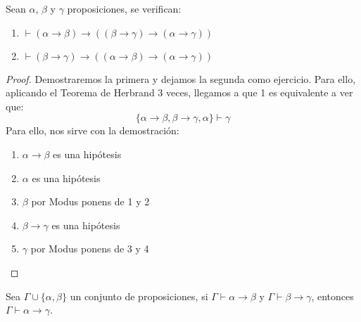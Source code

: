 \begin{prop}
    Sean $\alpha$, $\beta$ y $\gamma$ proposiciones, se verifican:
    \begin{enumerate}
        \item $\vdash (\alpha\to\beta)\to((\beta\to\gamma)\to(\alpha\to\gamma))$
        \item $\vdash (\beta\to\gamma)\to((\alpha\to\beta)\to(\alpha\to\gamma))$
    \end{enumerate}
    \begin{proof}
        Demostraremos la primera y dejamos la segunda como ejercicio. Para ello, aplicando el Teorema de Herbrand 3 veces, llegamos a que 1 es equivalente a ver que:
        \begin{equation*}
            \{\alpha\to\beta,\beta\to\gamma,\alpha\}\vdash \gamma
        \end{equation*}
        Para ello, nos sirve con la demostración:
        \begin{enumerate}
            \item $\alpha\to\beta$ es una hipótesis
            \item $\alpha$ es una hipótesis
            \item $\beta$ por Modus ponens de 1 y 2
            \item $\beta\to\gamma$ es una hipótesis
            \item $\gamma$ por Modus ponens de 3 y 4
        \end{enumerate}
    \end{proof}
\end{prop}

\begin{coro}
    Sea $\Gamma\cup\{\alpha,\beta\}$ un conjunto de proposiciones, si $\Gamma\vdash \alpha\to\beta$ y $\Gamma\vdash \beta\to\gamma$, entonces $\Gamma\vdash \alpha\to\gamma$.
\end{coro}


